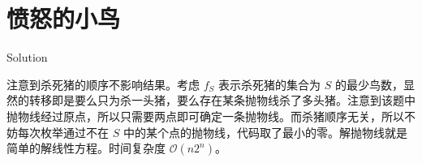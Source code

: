 \section{愤怒的小鸟}

\begin{frame}{Solution}

注意到杀死猪的顺序不影响结果。考虑 $f_{S}$ 表示杀死猪的集合为 $S$ 的最少鸟数，显然的转移即是要么只为杀一头猪，要么存在某条抛物线杀了多头猪。注意到该题中抛物线经过原点，所以只需要两点即可确定一条抛物线。而杀猪顺序无关，所以不妨每次枚举通过不在 $S$ 中的某个点的抛物线，代码取了最小的零。解抛物线就是简单的解线性方程。时间复杂度 $\mathcal O(n2^n)$。 

\end{frame}